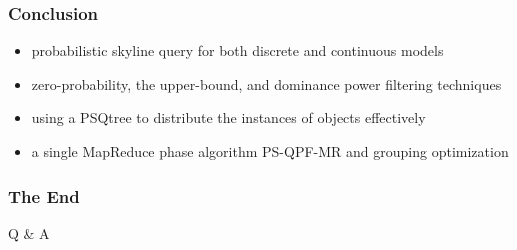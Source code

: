 \documentclass{beamer}
\begin{document}
\begin{frame} %
\frametitle{Conclusion}
\begin{itemize}
\item probabilistic skyline query for both discrete and continuous models
\item zero-probability, the upper-bound, and dominance power filtering techniques
\item using a PSQtree to distribute the instances of objects effectively
\item a single MapReduce phase algorithm PS-QPF-MR and grouping optimization
\end{itemize}
\end{frame}



\begin{frame}
\frametitle{The End}
\Huge{\centerline{Q \& A}}
\end{frame}

\end{document}
